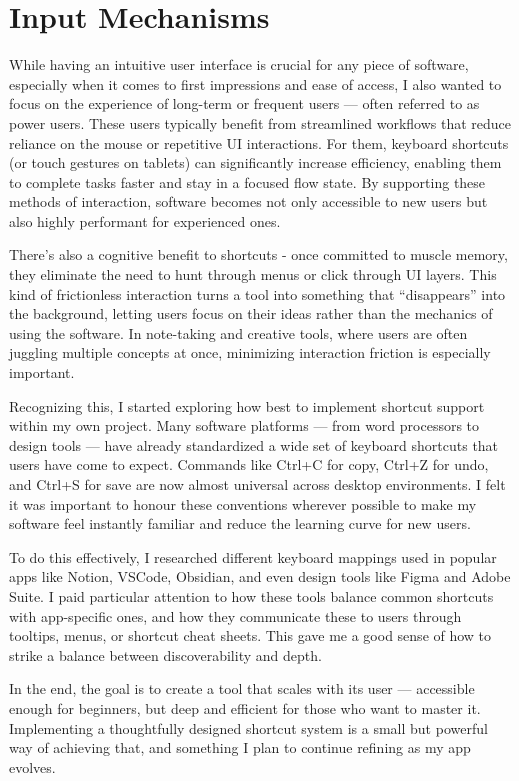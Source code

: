 \section{Input Mechanisms}
\label{research:InputMechanisms}
While having an intuitive user interface is crucial for any piece of software, especially when it comes to first impressions and ease of access, I also wanted to focus on the experience of long-term or frequent users — often referred to as power users. These users typically benefit from streamlined workflows that reduce reliance on the mouse or repetitive UI interactions. For them, keyboard shortcuts (or touch gestures on tablets) can significantly increase efficiency, enabling them to complete tasks faster and stay in a focused flow state. By supporting these methods of interaction, software becomes not only accessible to new users but also highly performant for experienced ones.

There's also a cognitive benefit to shortcuts - once committed to muscle memory, they eliminate the need to hunt through menus or click through UI layers. This kind of frictionless interaction turns a tool into something that “disappears” into the background, letting users focus on their ideas rather than the mechanics of using the software. In note-taking and creative tools, where users are often juggling multiple concepts at once, minimizing interaction friction is especially important.

Recognizing this, I started exploring how best to implement shortcut support within my own project. Many software platforms — from word processors to design tools — have already standardized a wide set of keyboard shortcuts that users have come to expect. Commands like Ctrl+C for copy, Ctrl+Z for undo, and Ctrl+S for save are now almost universal across desktop environments. I felt it was important to honour these conventions wherever possible to make my software feel instantly familiar and reduce the learning curve for new users.

To do this effectively, I researched different keyboard mappings used in popular apps like Notion, VSCode, Obsidian, and even design tools like Figma and Adobe Suite. I paid particular attention to how these tools balance common shortcuts with app-specific ones, and how they communicate these to users through tooltips, menus, or shortcut cheat sheets. This gave me a good sense of how to strike a balance between discoverability and depth.

In the end, the goal is to create a tool that scales with its user — accessible enough for beginners, but deep and efficient for those who want to master it. Implementing a thoughtfully designed shortcut system is a small but powerful way of achieving that, and something I plan to continue refining as my app evolves.

